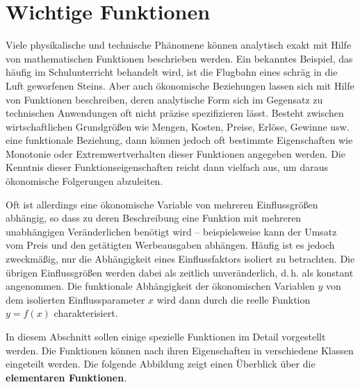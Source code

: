 \section{Wichtige Funktionen}

Viele physikalische und technische Phänomene können analytisch exakt mit Hilfe von mathematischen Funktionen beschrieben werden. Ein bekanntes Beispiel, das häufig im Schulunterricht behandelt wird, ist die Flugbahn eines schräg in die Luft geworfenen Steins. Aber auch ökonomische Beziehungen lassen sich mit Hilfe von Funktionen beschreiben, deren analytische Form sich im Gegensatz zu technischen Anwendungen oft nicht präzise spezifizieren lässt. Besteht zwischen wirtschaftlichen Grundgrößen wie Mengen, Kosten, Preise, Erlöse, Gewinne usw. eine funktionale Beziehung, dann können jedoch oft bestimmte Eigenschaften wie Monotonie oder Extremwertverhalten dieser Funktionen angegeben werden. Die Kenntnis dieser Funktionseigenschaften reicht dann vielfach aus, um daraus ökonomische Folgerungen abzuleiten.

Oft ist allerdings eine ökonomische Variable von mehreren Einflussgrößen abhängig, so dass zu deren Beschreibung eine Funktion mit mehreren unabhängigen Veränderlichen benötigt wird -- beispielsweise kann der Umsatz vom Preis und den getätigten Werbeausgaben abhängen. Häufig ist es jedoch zweckmäßig, nur die Abhängigkeit eines Einflussfaktors isoliert zu betrachten. Die übrigen Einflussgrößen werden dabei als zeitlich unveränderlich, d.\,h. als konstant angenommen. Die funktionale Abhängigkeit der ökonomischen Variablen $y$ von dem isolierten Einflussparameter $x$ wird dann durch die reelle Funktion $y = f(x)$ charakterisiert.

In diesem Abschnitt sollen einige spezielle Funktionen im Detail vorgestellt werden. Die Funktionen können nach ihren Eigenschaften in verschiedene Klassen eingeteilt werden. Die folgende Abbildung zeigt einen Überblick über die \textbf{elementaren Funktionen}.

\begin{center}
\end{center}


